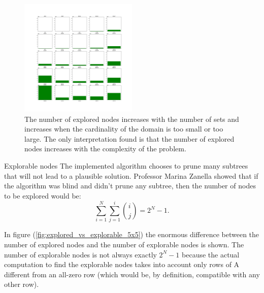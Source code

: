 \documentclass{beamer}
\begin{document}
\begin{frame}
    \begin{figure}
        \centering
        \includegraphics[width=0.5\textwidth]{explored_5x5.pdf}
        \caption{The number of explored nodes increases with the number of sets and increases
        when the cardinality of the domain is too small or too large. The only interpretation
        found is that the number of explored nodes increases with the complexity of the problem.}
        \label{fig:explored_5x5}
    \end{figure}
\end{frame}

\begin{frame}{Explorable nodes}
    The implemented algorithm chooses to prune many subtrees
    that will not lead to a plausible solution.
    Professor Marina Zanella showed that if the algorithm was blind and didn't prune any subtree,
    then the number of nodes to be explored would be:
    \begin{equation*}
        \sum_{i=1}^{N}\sum_{j=1}^{i}\binom{i}{j} = 2^N-1.
    \end{equation*}

    In figure (\ref{fig:explored_vs_explorable_5x5}) the enormous difference
    between the number of explored nodes and the number of explorable nodes is shown.
    The number of explorable nodes is not always exactly $2^N - 1$ because
    the actual computation to find the explorable nodes takes into 
    account only rows of A different from an all-zero row (which would be,
    by definition, compatible with any other row).
\end{frame}
\end{document}
